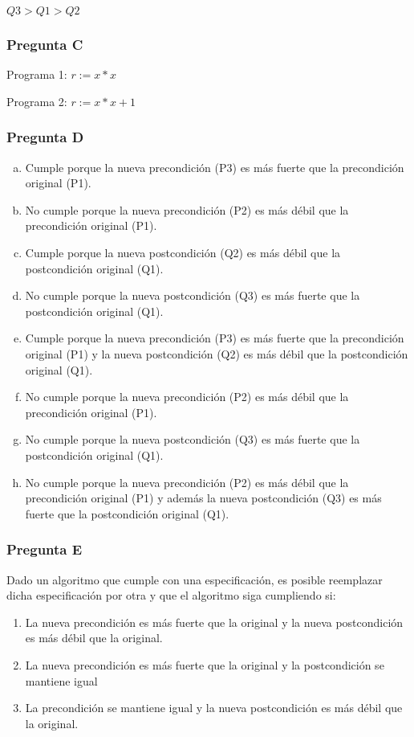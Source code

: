 $Q3 > Q1 > Q2$

\subsubsection{Pregunta C}

Programa 1: $r := x * x$

Programa 2: $r := x * x + 1$

\subsubsection{Pregunta D}

\begin{enumerate}[a)]
    \item Cumple porque la nueva precondición (P3) es más fuerte que la precondición original (P1).
    \item No cumple porque la nueva precondición (P2) es más débil que la precondición original (P1).
    \item Cumple porque la nueva postcondición (Q2) es más débil que la postcondición original (Q1).
    \item No cumple porque la nueva postcondición (Q3) es más fuerte que la postcondición original (Q1).
    \item Cumple porque la nueva precondición (P3) es más fuerte que la precondición original (P1) y la nueva postcondición (Q2) es más débil que la postcondición original (Q1).
    \item No cumple porque la nueva precondición (P2) es más débil que la precondición original (P1).
    \item No cumple porque la nueva postcondición (Q3) es más fuerte que la postcondición original (Q1).
    \item No cumple porque la nueva precondición (P2) es más débil que la precondición original (P1) y además la nueva postcondición (Q3) es más fuerte que la postcondición original (Q1).
\end{enumerate}

\subsubsection{Pregunta E}

Dado un algoritmo que cumple con una especificación, es posible reemplazar dicha especificación por otra y que el algoritmo siga cumpliendo si:

\begin{enumerate}[1)]
    \item La nueva precondición es más fuerte que la original y la nueva postcondición es más débil que la original.
    \item La nueva precondición es más fuerte que la original y la postcondición se mantiene igual
    \item La precondición se mantiene igual y la nueva postcondición es más débil que la original.
\end{enumerate}

